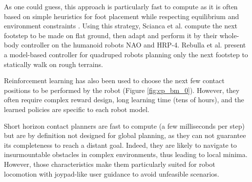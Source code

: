 As one could guess, this approach is particularly fast to compute as it is often based on simple heuristics for foot placement while respecting equilibrium and environment constraints \cite{raibert_heuritics_1986}.
Using this strategy, Scianca et al. \cite{Scianca_2020} compute the next footstep to be made on flat ground, then adapt and perform it by their whole-body controller on the humanoid robots NAO and HRP-4.
Rebulla et al. \cite{rebula_2007_little_dog} present a model-based controller for quadruped robots planning only the next footstep to statically walk on rough terrains.

Reinforcement learning has also been used to choose the next few contact positions to be performed by the robot \cite{deepGait, RLOC} (Figure \ref{fig:cp_bm_0}). However, they often require complex reward design, long learning time (tens of hours), and the learned policies are specific to each robot model.

Short horizon contact planners are fast to compute (a few milliseconds per step) but are by definition not designed for global planning, as they can not guarantee its completeness to reach a distant goal. 
Indeed, they are likely to navigate to insurmountable obstacles in complex environments, thus leading to local minima.
However, those characteristics make them particularly suited for robot locomotion with joypad-like user guidance to avoid unfeasible scenarios.


